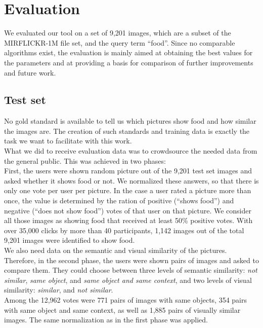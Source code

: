 %
\section{Evaluation}
\label{sec_evaluation}

We evaluated our tool on a set of 9,201 images, which are a subset of the MIRFLICKR-1M file set, and the query term ``food''. Since no comparable algorithms exist, the evaluation is mainly aimed at obtaining the best values for the parameters and at providing a basis for comparison of further improvements and future work.

\subsection{Test set}
\label{sec_testset}
No gold standard is available to tell us which pictures show food and how similar the images are. The creation of such standards and training data is exactly the task we want to facilitate with this work.\\ 
What we did to receive evaluation data was to crowdsource the needed data from the general public. This was achieved in two phases:\\

First, the users were shown random picture out of the 9,201 test set images and asked whether it shows food or not. We normalized these answers, so that there is only one vote per user per picture. In the case a user rated a picture more than once, the value is determined by the ration of positive (``shows food'') and negative (``does not show food'') votes of that user on that picture. We consider all those images as showing food that received at least 50\% positive votes. With over 35,000 clicks by more than 40 participants, 1,142 images out of the total 9,201 images were identified to show food. \\

We also need data on the semantic and visual similarity of the pictures. Therefore, in the second phase, the users were shown pairs of images and asked to compare them. They could choose between three levels of semantic similarity: \emph{not similar}, \emph{same object}, and \emph{same object and same context}, and two levels of visual similarity: \emph{similar}, and \emph{not similar}.\\
Among the 12,962 votes were 771 pairs of images with same objects, 354 pairs with same object and same context, as well as 1,885 pairs of visually similar images. The same normalization as in the first phase was applied.

